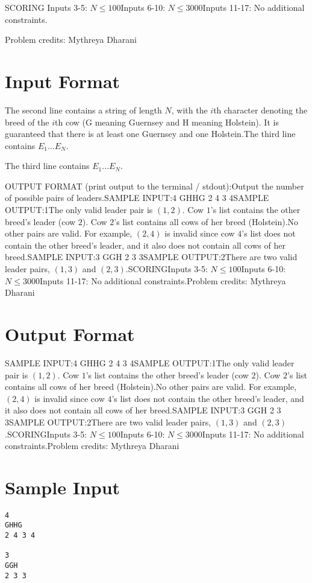 \documentclass[12pt]{article}
\begin{document}
SCORING
Inputs 3-5: $N \leq 100$Inputs 6-10: $N \leq 3000$Inputs 11-17: No additional constraints.


Problem credits: Mythreya Dharani



\section*{Input Format}
The second line contains a string of length $N$, with the $i$th character
denoting the breed of the $i$th cow (G meaning Guernsey and H meaning Holstein).
It is guaranteed that there is at least one Guernsey and one Holstein.The third line contains $E_1 \dots E_N$.

The third line contains $E_1 \dots E_N$.

OUTPUT FORMAT (print output to the terminal / stdout):Output the number of possible pairs of leaders.SAMPLE INPUT:4
GHHG
2 4 3 4SAMPLE OUTPUT:1The only valid leader pair is $(1, 2)$. Cow $1$'s list contains the other
breed's leader (cow $2$). Cow $2$'s list contains all cows of her breed
(Holstein).No other pairs are valid. For example, $(2,4)$ is invalid since cow $4$'s list
does not contain the other breed's leader, and it also does not contain all cows
of her breed.SAMPLE INPUT:3
GGH
2 3 3SAMPLE OUTPUT:2There are two valid leader pairs, $(1, 3)$ and $(2, 3)$.SCORINGInputs 3-5: $N \leq 100$Inputs 6-10: $N \leq 3000$Inputs 11-17: No additional constraints.Problem credits: Mythreya Dharani

\section*{Output Format}
SAMPLE INPUT:4
GHHG
2 4 3 4SAMPLE OUTPUT:1The only valid leader pair is $(1, 2)$. Cow $1$'s list contains the other
breed's leader (cow $2$). Cow $2$'s list contains all cows of her breed
(Holstein).No other pairs are valid. For example, $(2,4)$ is invalid since cow $4$'s list
does not contain the other breed's leader, and it also does not contain all cows
of her breed.SAMPLE INPUT:3
GGH
2 3 3SAMPLE OUTPUT:2There are two valid leader pairs, $(1, 3)$ and $(2, 3)$.SCORINGInputs 3-5: $N \leq 100$Inputs 6-10: $N \leq 3000$Inputs 11-17: No additional constraints.Problem credits: Mythreya Dharani

\section*{Sample Input}
\begin{verbatim}
4
GHHG
2 4 3 4

3
GGH
2 3 3
\end{verbatim}
\end{document}
